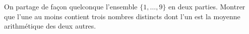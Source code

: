 On partage de façon quelconque l'ensemble $\{1, \ldots, 9\}$ en deux parties. Montrer que l'une au moins contient trois nombres distincts dont l'un est la moyenne arithmétique des deux autres.
